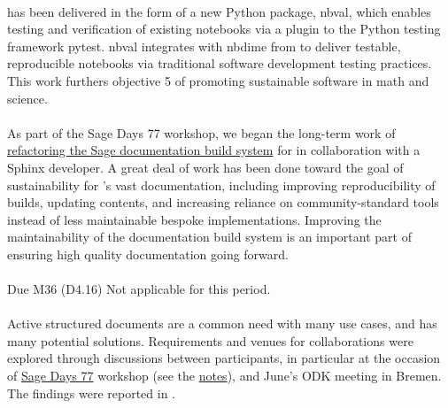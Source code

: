 \documentclass{deliverablereport}
\begin{document}
\paragraph{}

 has been delivered in the form of a new Python package, nbval,
which enables testing and verification of existing notebooks via a plugin to the Python testing
framework pytest. nbval integrates with nbdime from  to deliver
testable, reproducible notebooks via traditional software development testing practices.
This work furthers \ODK objective 5 of promoting sustainable software in math and science.

\paragraph{}
\label{UI@sage-sphinx}

As part of the Sage Days 77 workshop, we began the long-term work of
\href{https://wiki.sagemath.org/days77/documentation}{refactoring the Sage documentation build
system} for  in collaboration with a Sphinx developer. A great deal
of work has been done toward the goal of sustainability for \Sage's vast documentation, including
improving reproducibility of builds, updating contents, and increasing reliance on
community-standard tools instead of less maintainable bespoke
implementations. Improving the maintainability of the \Sage
documentation build system is an important part of ensuring high quality documentation going forward.

\paragraph{} Due M36 (D4.16)
Not applicable for this period.

\paragraph{}

Active structured documents are a common need with many use cases, and has many potential solutions.
Requirements and venues for collaborations were explored through discussions between participants,
in particular at the occasion of \href{https://wiki.sagemath.org/days77/}{Sage Days 77} workshop
(see the \href{https://wiki.sagemath.org/days77/live-structured-documents}{notes}), and June's ODK
meeting in Bremen. The findings were reported in .
\end{document}
